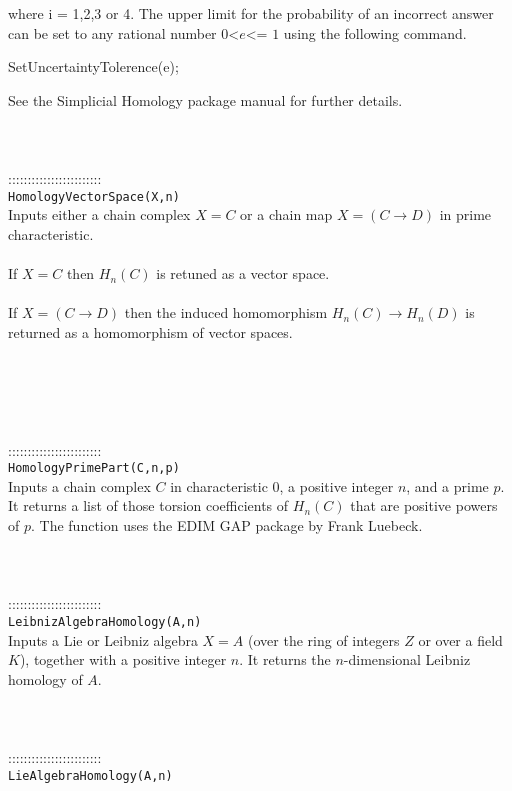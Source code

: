 \documentclass[a4paper,11pt]{report}
\begin{document}
{ where i = 1,2,3 or 4. The upper limit for the probability of an incorrect
answer can be set to any rational number $0${\textless}$e${\textless}= $1$ using the following command. 

SetUncertaintyTolerence(e);

 See the Simplicial Homology package manual for further details. \\
 \\
 \\
 \\
 ::::::::::::::::::::::::\\
 \texttt{HomologyVectorSpace(X,n)}\\
 

 Inputs either a chain complex $X=C$ or a chain map $X=(C \longrightarrow D)$ in prime characteristic. \\
 \\
If $X=C$ then $H_n(C)$ is retuned as a vector space.\\
 \\
 If $X=(C \longrightarrow D)$ then the induced homomorphism $H_n(C) \longrightarrow H_n(D)$ is returned as a homomorphism of vector spaces. \\
 \\
 \\
 \\
 \\
 \\
 ::::::::::::::::::::::::\\
 \texttt{HomologyPrimePart(C,n,p)}\\
 

 Inputs a chain complex $C$ in characteristic 0, a positive integer $n$, and a prime $p$. It returns a list of those torsion coefficients of $H_n(C)$ that are positive powers of $p$. The function uses the EDIM GAP package by Frank Luebeck. \\
 \\
 \\
 \\
 ::::::::::::::::::::::::\\
 \texttt{LeibnizAlgebraHomology(A,n)}\\
 

 Inputs a Lie or Leibniz algebra $X=A$ (over the ring of integers $Z$ or over a field $K$), together with a positive integer $n$. It returns the $n$-dimensional Leibniz homology of $A$. \\
 \\
 \\
 \\
 ::::::::::::::::::::::::\\
 \texttt{LieAlgebraHomology(A,n)}\\
 

}
\end{document}
